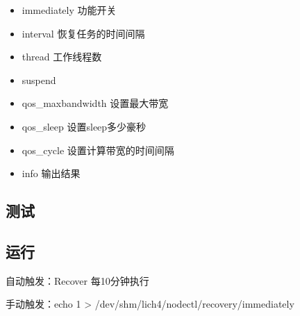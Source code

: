 \begin{itemize}
    \item immediately       功能开关
    \item interval          恢复任务的时间间隔
    \item thread            工作线程数
    \item suspend
    \item qos\_maxbandwidth 设置最大带宽
    \item qos\_sleep        设置sleep多少豪秒
    \item qos\_cycle        设置计算带宽的时间间隔
    \item info              输出结果
\end{itemize}

\subsection{测试}

\subsection{运行}

\begin{tcolorbox}
    自动触发：Recover 每10分钟执行

    手动触发：echo 1 > /dev/shm/lich4/nodectl/recovery/immediately
\end{tcolorbox}
